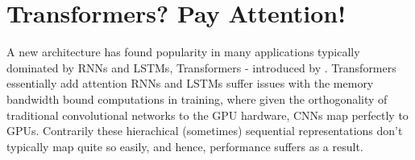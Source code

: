 \section{ Transformers? Pay Attention! }
A new architecture has found popularity in many applications typically dominated by RNNs and LSTMs, Transformers - introduced by \cite{DBLP:journals/corr/VaswaniSPUJGKP17}. Transformers essentially add attention 
RNNs and LSTMs suffer issues with the memory bandwidth bound computations in training, where given the orthogonality of traditional convolutional networks to the GPU hardware, CNNs map perfectly to GPUs. Contrarily these hierachical (sometimes) sequential representations don't typically map quite so easily, and hence, performance suffers as a result.\\